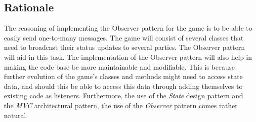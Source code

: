     \subsection{Rationale}
    The reasoning of implementing the Observer pattern for the game is to be able to easily send one-to-many messages. The game will consist of several classes that need to broadcast their status updates to several parties. The Observer pattern will aid in this task. The implementation of the Observer pattern will also help in making the code base be more maintainable and modifiable. This is because further evolution of the game's classes and methods might need to access state data, and should this be able to access this data through adding themselves to existing code as listeners. Furthermore, the use of the \emph{State} design pattern and the \emph{MVC} architectural pattern, the use of the \emph{Observer} pattern comes rather natural.
    